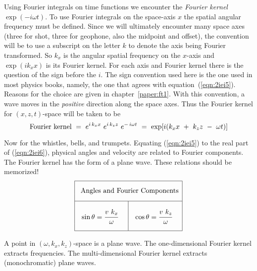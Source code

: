 Using Fourier integrals on time functions we encounter the
{\em  Fourier kernel}
$\exp(-i\omega t)$.
To use Fourier integrals on the
space-axis  $x$  the spatial angular frequency must be defined.
Since we will ultimately encounter many space axes
(three for shot, three for geophone, also the midpoint and offset),
the convention will be to use a
subscript on the letter  $k$  to denote the
axis being Fourier transformed.
So  $ k_x $  is the angular spatial frequency on
the $x$-axis and  $ \exp ( i k_x x ) $  is
its Fourier kernel.
For each axis and Fourier kernel there is the question of the 
sign before the $i$.
The sign convention used here is the one used in most physics books,
namely, the one that agrees with equation~(\ref{eqn:2iei5}).
Reasons for the choice are given in chapter~\ref{paper:ft1}.
With this convention, a wave moves in the
{\em  positive}
direction along the space axes.
Thus the Fourier kernel for  $(x , z , t)$-space
will be taken to be
\begin{equation}
\hbox{Fourier kernel} \ =\  
e^{ i \, k_x x} \  e^{ i \, k_z z} \  e^{ - \, i \omega t} 
\ = \ 
\exp [ i ( k_x x  \ +\  k_z z \ -\  \omega t ) ]
\label{eqn:2iei6}
\end{equation}
\par
Now for the whistles, bells, and trumpets.
Equating (\ref{eqn:2iei5}) to the real part of (\ref{eqn:2iei6}),
physical angles and velocity are related to Fourier components.
The Fourier kernel has the form of a plane wave.
These relations should be memorized!
\begin{equation}
\vbox{\offinterlineskip
  \def\tablerule{\noalign{\hrule}}
  \hrule
  \halign {&\vrule#&
    \strut\quad\hfil#\quad\cr
    height10pt &\multispan3 &\cr
    &\multispan3 {\hfil\rm Angles and Fourier Components}\hfil&\cr
    height10pt &\multispan3 &\cr
    \tablerule
    height10pt &\omit    &&\omit  &\cr
    &$\sin \theta =\displaystyle {\strut v\ k_x \over \omega}$
          &&$\cos \theta = \displaystyle {\strut v\ k_z \over \omega}$ &\cr
   height10pt &\omit    &&\omit  &\cr
  } 
  \hrule}
\label{eqn:sincos}
\end{equation}
\par\noindent
A point in $(\omega,k_x,k_z)$-space is a plane wave.
The one-dimensional Fourier kernel extracts frequencies.
The multi-dimensional Fourier kernel extracts (monochromatic) plane waves.

